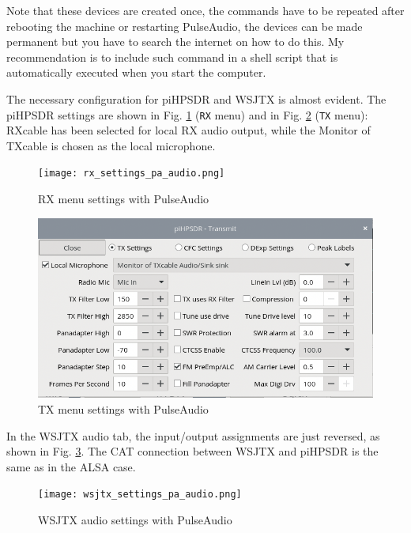 \documentclass[12pt]{book}
\def\bltt#1{\texttt{\color{blue}#1}}
\def\pH{pi\-HPSDR\xspace}
\begin{document}
Note that these devices are created once, the commands have to be repeated after rebooting
the machine or restarting PulseAudio, the devices can be made permanent but you have to
search the internet on how to do this. My recommendation is to include such command in a
shell script that is automatically executed when you start the computer.

The necessary configuration for \pH and WSJTX is  almost evident. The
\pH settings are shown in Fig. \ref{fig:rx_settings_pa_audio} (\bltt{RX} menu)
and in Fig. \ref{fig:tx_settings_pa_audio} (\bltt{TX} menu): RXcable has been selected
for local RX audio output, while the Monitor of TXcable is chosen as the local
microphone.

\begin{figure}[ht]
\center
\texttt{[image: rx\_settings\_pa\_audio.png]}
\caption{RX menu settings with PulseAudio}
\label{fig:rx_settings_pa_audio}
\end{figure}

\begin{figure}[ht]
\label{fig:pa2}
\center
\includegraphics[scale=0.45]{tx_settings_pa_audio.png}
\caption{TX menu settings with PulseAudio}
\label{fig:tx_settings_pa_audio}
\end{figure}

In the WSJTX audio tab, the input/output assignments are just reversed, as shown
in Fig. \ref{fig:wstx_settings_pa_audio}. The CAT connection between WSJTX and \pH is
the same as in the ALSA case.

\begin{figure}[ht]
\center
\texttt{[image: wsjtx\_settings\_pa\_audio.png]}
\caption{WSJTX audio settings with PulseAudio}
\label{fig:wstx_settings_pa_audio}
\end{figure}
\end{document}
